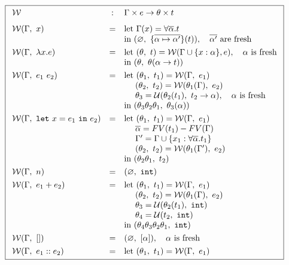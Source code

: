 \begin{figure}[p]
\centering
\[
\boxed{
\begin{array}{lcl}
\W & : & \Gamma \times e \rightarrow \tsu \times t
\\[0.1in]
\W(\Gamma,\ x)
   & = & \text{let } \Gamma(x) = \forall \overline{\alpha}. t \\
   &   & \text{in } (\emptysu,\ \{\overline{\alpha \mapsto \alpha'}\}(t)),\quad \overline{\alpha'} \text{ are fresh}
\\[0.05in]
\W(\Gamma,\ \efun{x}{e})
   & = & \text{let } (\tsu,\ t) = \W(\Gamma \cup \{x:\alpha\}, e),\quad \alpha \text{ is fresh} \\
   &   & \text{in  } (\tsu,\ \tsu(\tarr{\alpha}{t}))
\\[0.05in]
\W(\Gamma,\ \eapp{e_1}{e_2})
   & = & \text{let } (\tsu_1,\ t_1) = \W(\Gamma,\ e_1) \\
   &   & \quad\ (\tsu_2,\ t_2) = \W(\tsu_1(\Gamma),\ e_2) \\
   &   & \quad\ \tsu_3 = \U(\tsu_2(t_1),\ \tarr{t_2}{\alpha}),\quad \alpha \text{ is fresh} \\
   &   & \text{in } (\tsu_3\tsu_2\tsu_1,\ \tsu_3(\alpha))
\\[0.05in]
\W(\Gamma,\ \elet{x}{e_1}{e_2})
   & = & \text{let } (\tsu_1,\ t_1) = \W(\Gamma,\ e_1) \\
   &   & \quad\ \overline{\alpha} = FV(t_1) - FV(\Gamma) \\
   &   & \quad\ \Gamma' = \Gamma \cup \{x_1 : \forall \overline{\alpha}. t_1\} \\
   &   & \quad\ (\tsu_2,\ t_2) = \W(\tsu_1(\Gamma'),\ e_2) \\
   &   & \text{in } (\tsu_2\tsu_1,\ t_2)
\\[0.05in]
\W(\Gamma,\ n)
   & = & (\emptysu,\ \tint)
\\[0.05in]
\W(\Gamma,\ \eplus{e_1}{e_2})
   & = & \text{let } (\tsu_1,\ t_1) = \W(\Gamma,\ e_1) \\
   &   & \quad\ (\tsu_2,\ t_2) = \W(\tsu_1(\Gamma),\ e_2) \\
   &   & \quad\ \tsu_3 = \U(\tsu_2(t_1),\ \tint) \\
   &   & \quad\ \tsu_4 = \U(t_2,\ \tint) \\
   &   & \text{in } (\tsu_4\tsu_3\tsu_2\tsu_1,\ \tint)
\\[0.05in]
\W(\Gamma,\ \enil)
   & = & (\emptysu,\ \tlist{\alpha}), \quad \alpha \text{ is fresh}
\\[0.05in]
\W(\Gamma,\ \econs{e_1}{e_2})
   & = & \text{let } (\tsu_1,\ t_1) = \W(\Gamma,\ e_1) \\

\end{array}}\]
\end{figure}
